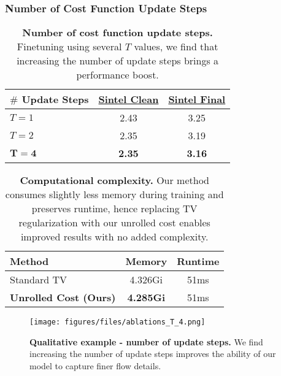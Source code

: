 \documentclass[10pt,twocolumn,letterpaper]{article}
\begin{document}
\subsubsection{Number of Cost Function Update Steps}
\begin{table}
\begin{center}
\begin{tabular}{l c c} 
    \toprule
    \textbf{$\#$ Update Steps} & \textbf{\underline{Sintel Clean}} & \textbf{\underline{Sintel Final}} \\
    \midrule
    $T=1$               & 2.43   & 3.25 \\
    $T=2$               & 2.35   & 3.19 \\
    $\mathbf{T=4}$      & \textbf{2.35}   & \textbf{3.16} \\
    \bottomrule
\end{tabular}
\end{center}
\caption{\textbf{Number of cost function update steps.} 
    Finetuning using several $T$ values, we find that increasing the number of update steps brings a performance boost.
}
\label{ta:admm_iters}
\end{table} \begin{table}
\begin{center}
\begin{tabular}{l c c} 
    \toprule
    \textbf{Method} & \textbf{Memory} & \textbf{Runtime} \\
    \midrule
    Standard TV                 & 4.326Gi   & 51ms \\
    \textbf{Unrolled Cost (Ours)}      & \textbf{4.285Gi}   & 51ms \\
    \bottomrule
\end{tabular}
\end{center}
\caption{\textbf{Computational complexity.} 
    Our method consumes slightly less memory during training and preserves runtime, hence 
    replacing TV regularization with our unrolled cost enables improved results with no added complexity.
}
\label{ta:comp}
\end{table} \begin{figure}
\begin{center}
\texttt{[image: figures/files/ablations\_T\_4.png]}
\end{center}
   \caption{\textbf{Qualitative example - number of update steps.}
   We find increasing the number of update steps improves the ability of our model to capture finer flow details.}
\label{fig:ab_T}
\end{figure}
 
\end{document}
